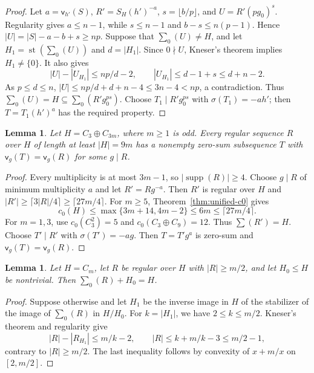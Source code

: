 \documentclass[10pt,a4paper]{amsart}
\newtheorem{lem}[thm]{Lemma}
\theoremstyle{definition}
\theoremstyle{remark}
\numberwithin{equation}{section}
\DeclareMathOperator{\supp}{supp}
\DeclareMathOperator{\st}{st}
\begin{document}
\begin{proof}
Let $a=\mathsf v_{h'}(S)$, $R'=S_H(h')^{-a}$,
$s=\lfloor b/p\rfloor$, and $U=R'(pg_0)^s$.
Regularity gives $a\le n-1$, while $s\le n-1$ and
$b-s\le n(p-1)$. Hence $|U|=|S|-a-b+s\ge np$.
Suppose that $\sum_0(U)\ne H$, and let
$H_1=\st(\sum_0(U))$ and $d=|H_1|$.
Since $0\nmid U$, Kneser's theorem implies $H_1\ne\{0\}$.
It also gives
\[
|U|-|U_{H_1}|\le np/d-2,\qquad
|U_{H_1}|\le d-1+s\le d+n-2.
\]
As $p\le d\le n$,
$|U|\le np/d+d+n-4\le3n-4<np$, a contradiction.
Thus $\sum_0(U)=H\subseteq\sum_0(R'g_0^{ps})$.
Choose $T_1\mid R'g_0^{ps}$ with $\sigma(T_1)=-ah'$;
then $T=T_1(h')^a$ has the required property.
\end{proof}

\begin{lem}\label{lem:N-noncyclic-subgroup-three}
Let $H=C_3\oplus C_{3m}$, where $m\ge1$ is odd.
Every regular sequence $R$ over $H$ of length at least $|H|=9m$
has a nonempty zero-sum subsequence $T$ with
$\mathsf v_g(T)=\mathsf v_g(R)$ for some $g\mid R$.
\end{lem}

\begin{proof}
Every multiplicity is at most $3m-1$, so $|\supp(R)|\ge4$.
Choose $g\mid R$ of minimum multiplicity $a$ and let $R'=Rg^{-a}$.
Then $R'$ is regular over $H$ and
$|R'|\ge\lceil3|R|/4\rceil\ge\lceil27m/4\rceil$.
For $m\ge5$, Theorem~\ref{thm:unified-c0} gives
\[
c_0(H)\le\max\{3m+14,4m-2\}\le6m\le\lceil27m/4\rceil.
\]
For $m=1,3$, use $c_0(C_3^2)=5$ and $c_0(C_3\oplus C_9)=12$.
Thus $\sum(R')=H$. Choose $T'\mid R'$ with $\sigma(T')=-ag$.
Then $T=T'g^a$ is zero-sum and $\mathsf v_g(T)=\mathsf v_g(R)$.
\end{proof}

\begin{lem}\label{lem:N-half-quotient}
Let $H=C_m$, let $R$ be regular over $H$ with $|R|\ge m/2$,
and let $H_0\le H$ be nontrivial. Then $\sum_0(R)+H_0=H$.
\end{lem}
\begin{proof}
Suppose otherwise and let $H_1$ be the inverse image in $H$ of the
stabilizer of the image of $\sum_0(R)$ in $H/H_0$.
For $k=|H_1|$, we have $2\le k\le m/2$.
Kneser's theorem and regularity give
\[
 |R|-|R_{H_1}|\le m/k-2,\qquad
 |R|\le k+m/k-3\le m/2-1,
\]
contrary to $|R|\ge m/2$. The last inequality follows by convexity
of $x+m/x$ on $[2,m/2]$.
\end{proof}
\end{document}
